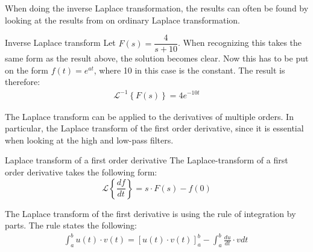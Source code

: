 When doing the inverse Laplace transformation, the results can often be found by looking at the results from on ordinary Laplace transformation.
\begin{example}{Inverse Laplace transform}{}
Let $F(s) = \dfrac{4}{s+10}$. When recognizing this takes the same form as the result above, the solution becomes clear. Now this has to be put on the form $f(t)=e^{at}$, where 10 in this case is the constant. The result is therefore: \cite[p. 323]{diffandcomplex}
\begin{align*}
\mathcal{L}^{-1} \left\{F(s) \right\} = 4e^{-10t}
\end{align*}
\end{example}
The Laplace transform can be applied to the derivatives of multiple orders. In particular, the Laplace transform of the first order derivative, since it is essential when looking at the high and low-pass filters.
\begin{theorem}{Laplace transform of a first order derivative}{}
The Laplace-transform of a first order derivative takes the following form:
$$\mathcal{L} \left\{\frac{df}{dt} \right\} = s \cdot F(s)-f(0)$$
\end{theorem}
The Laplace transform of the first derivative is using the rule of integration by parts. The rule states the following:
\begin{align}
\int_{a}^{b}{u(t) \cdot v(t)}=\left[u(t) \cdot v(t) \right]_{a}^{b}-\int_{a}^{b} \frac{du}{dt}\cdot v dt\
\label{eq6.3}
\end{align}
